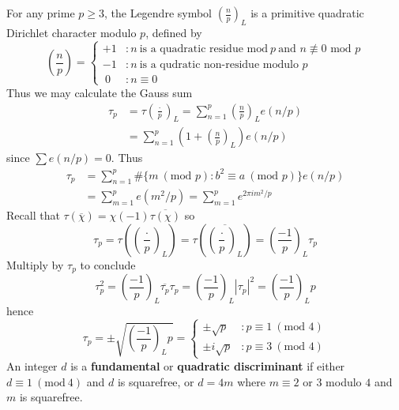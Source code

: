 For any prime $p \geq 3$, the Legendre symbol $\left( \frac{n}{p} \right)_L$ is a primitive quadratic Dirichlet character modulo $p$, defined by
%
\[ \left( \frac{n}{p} \right) = \begin{cases} +1 & : n\ \text{is a quadratic residue mod}\ p\ \text{and $n \not \equiv 0$ mod $p$} \\ -1 & : n\ \text{is a qudratic non-residue modulo $p$} \\ \ 0 & : n \equiv 0 \end{cases} \]
%
Thus we may calculate the Gauss sum
%
\begin{align*}
    \tau_p &= \tau \left( \frac{\cdot}{p} \right)_L = \sum_{n = 1}^p \left( \frac{n}{p} \right)_L e(n/p)\\
    &= \sum_{n = 1}^p \left( 1 + \left( \frac{n}{p} \right)_L \right) e(n/p)
\end{align*}
%
since $\sum e(n/p) = 0$. Thus
%
\begin{align*}
    \tau_p &= \sum_{n = 1}^p \# \{ m\ (\text{mod $p$}): b^2 \equiv a\ (\text{mod $p$}) \} e(n/p)\\
    &= \sum_{m = 1}^p e(m^2/p) = \sum_{m = 1}^p e^{2 \pi i m^2/p}
\end{align*}
%
Recall that $\tau(\overline{\chi}) = \chi(-1) \overline{\tau(\chi)}$ so
%
\[ \tau_p = \tau \left( \left( \frac{\cdot}{p} \right)_L \right) = \tau \left( \overline{\left( \frac{\cdot}{p} \right)_L} \right) = \left( \frac{-1}{p} \right)_L \tau_p \]
%
Multiply by $\tau_p$ to conclude
%
\[  \tau_p^2 = \left( \frac{-1}{p} \right)_L \overline{\tau_p} \tau_p  =\left( \frac{-1}{p} \right)_L |\tau_p|^2 = \left( \frac{-1}{p} \right)_L p \]
%
hence
%
\[ \tau_p = \pm \sqrt{\left( \frac{-1}{p} \right)_L p} = \begin{cases} \pm \sqrt{p} &: p \equiv 1\ (\text{mod 4})\\ \pm i \sqrt{p} & : p \equiv 3\ (\text{mod $4$}) \end{cases} \]
%
An integer $d$ is a {\bf fundamental} or {\bf quadratic discriminant} if either $d \equiv 1\ (\text{mod}\ 4)$ and $d$ is squarefree, or $d = 4m$ where $m \equiv 2$ or $3$ modulo $4$ and $m$ is squarefree.

